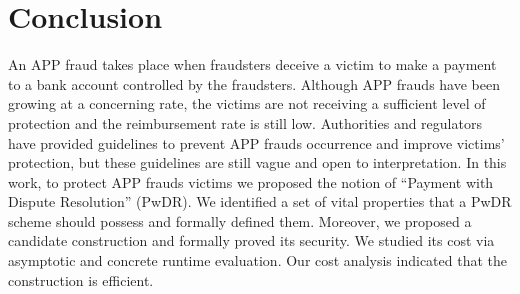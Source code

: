 
 \vspace{-2mm}
\section{Conclusion}\label{sec::conclusion}


An APP fraud takes place when fraudsters deceive a victim to make a payment to a bank account controlled by the fraudsters. Although APP frauds have been growing at a concerning rate, the  victims are not receiving a sufficient level of protection and the reimbursement rate is still low. Authorities and regulators have  provided guidelines  to prevent APP frauds occurrence and improve victims’ protection, but these guidelines are still vague and open to interpretation. In this work, to protect APP frauds victims  we proposed the notion of “Payment with Dispute Resolution” (PwDR). We identified a set of vital properties that a PwDR scheme should possess and formally defined them. Moreover,  we proposed a candidate construction and formally proved its security. We studied its cost via asymptotic and concrete runtime evaluation. Our cost analysis indicated that the construction is efficient. 





